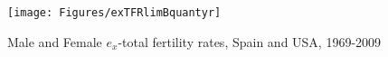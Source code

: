  \begin{figure}[ht!]
        \centering  
          \caption{Male and Female $e_x$-total fertility rates, Spain
          and USA, 1969-2009}
           \texttt{[image: Figures/exTFRlimBquantyr]}
          \label{fig:exTFRlimBquantyr}
\end{figure}
